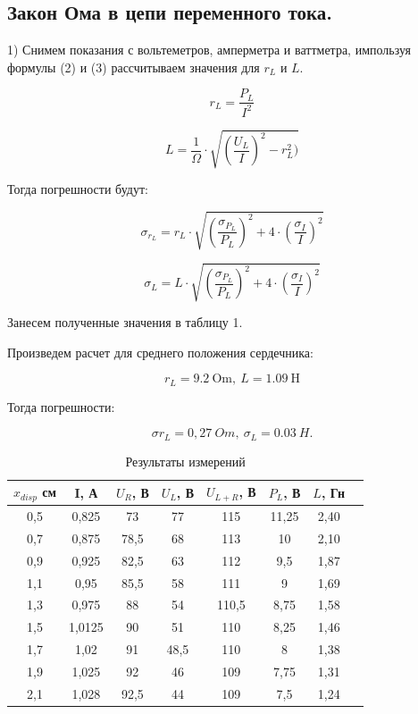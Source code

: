 \documentclass[a4paper, 14pt]{extarticle}%
\begin{document}
\subsection{Закон Ома в цепи переменного тока.}

1) Снимем показания с вольтеметров, амперметра и ваттметра, импользуя формулы (2) и (3) рассчитываем значения для $  r_{L}$ и $ L $.

\begin{equation}\label{}
r_L = \frac{P_L}{I^2}
\end{equation}

\begin{equation}\label{}
L = \frac{1}{\Omega}\cdot\sqrt{\left(\frac{U_L}{I}\right)^2 - r_L^2)}
\end{equation}

Тогда погрешности будут:

\begin{equation}\label{}
\sigma_{r_L} = r_L \cdot \sqrt{(\frac{\sigma_{P_L}}{P_L})^2 + 4\cdot(\frac{\sigma_I}{I})^2}
\end{equation}

\begin{equation}\label{}
\sigma_{L} = L \cdot \sqrt{(\frac{\sigma_{P_L}}{P_L})^2 + 4\cdot(\frac{\sigma_I}{I})^2}
\end{equation}


Занесем полученные значения в таблицу 1.

Произведем расчет для среднего положения сердечника:

$$
r_L = 9.2 \:\text{Om}, \:
L = 1.09\: \text{H}
$$

Тогда погрешности:

$$
\sigma{r_L} = 0,27\: Om, \:\sigma_{L} = 0.03\: H.
$$


\begin{table}[h!]
	\centering
	\caption{Результаты измерений}
	\begin{tabular}{|c|c|c|c|c|c|c|c|}
		\hline
		$x_{disp}$ см & I, А & $U_R$, В & $U_L$, В & $U_{L+R}$, В & $P_L$, В & $L$, Гн \\
		\hline
		0,5 & 0,825 & 73 & 77  & 115 & 11,25 & 2,40  \\
		 \hline
		 0,7 & 0,875 & 78,5 & 68 & 113 & 10 & 2,10 \\
		 \hline
		 0,9 & 0,925 & 82,5 & 63 & 112 & 9,5 & 1,87\\
		 \hline
		 1,1 & 0,95 & 85,5 & 58 & 111 & 9 & 1,69\\
		 \hline
		 1,3 & 0,975 & 88 & 54 & 110,5 & 8,75 & 1,58\\
		 \hline
		 1,5 & 1,0125 & 90 & 51 & 110 & 8,25 & 1,46\\
		 \hline
		 1,7 & 1,02 & 91 & 48,5 & 110 & 8 & 1,38\\
		 \hline
		 1,9 & 1,025 & 92 & 46 & 109 & 7,75 & 1,31\\
		 \hline
		 2,1 & 1,028 & 92,5 & 44 & 109 & 7,5 & 1,24 \\
		\hline
	\end{tabular}%
\label{resT}%
\end{table}%
\end{document}
